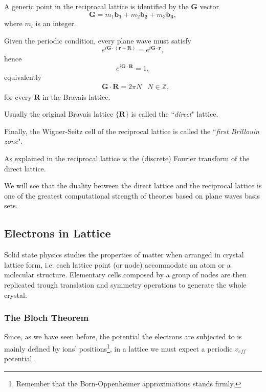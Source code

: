 \documentclass[a4paper,12pt]{article}
\begin{document}
A generic point in the reciprocal lattice is identified by the $\mathbf{G}$ vector 
\begin{equation}
	\mathbf{G} = m_1\mathbf{b_1} + m_2\mathbf{b_2} + m_3\mathbf{b_3},
\end{equation}
where $m_i$ is an integer.

Given the periodic condition, every plane wave must satisfy 
\begin{equation}
	e^{i \mathbf{G}\cdot (\mathbf{r} + \mathbf{R})} =  	e^{i \mathbf{G}\cdot \mathbf{r}},
\end{equation}
hence 
\begin{equation}
	e^{i \mathbf{G}\cdot \mathbf{R}} =  	1,
\end{equation}
equivalently 
\begin{align}
	&\mathbf{G}\cdot \mathbf{R} = 2\pi N &N\in\mathbb{Z},
\end{align}
for every $\mathbf{R}$ in the Bravais lattice.

Usually the original Bravais lattice $\{ \mathbf{R} \}$ is called the ``\textit{direct}" lattice.

Finally, the Wigner-Seitz cell of the reciprocal lattice is called the ``\textit{first Brillouin zone}".

As explained in \cite[p.121]{Manini} the reciprocal lattice is the (discrete) Fourier transform of the direct lattice.

We will see that the duality between the direct lattice and the reciprocal lattice is one of the greatest computational strength of theories based on plane waves basis sets.

\subsection{Electrons in Lattice}

Solid state physics studies the properties of matter when arranged in crystal lattice form, i.e. each lattice point (or node) accommodate an atom or a molecular structure. 
Elementary cells composed by a group of nodes are then replicated trough translation and symmetry operations to generate the whole crystal.
\subsubsection{The Bloch Theorem}
Since, as we have seen before, the potential the electrons are subjected to is mainly defined by ions' positions\footnote{Remember that the Born-Oppenheimer approximations stands firmly.}, in a lattice we must expect a periodic $v_{eff}$ potential.
\end{document}
